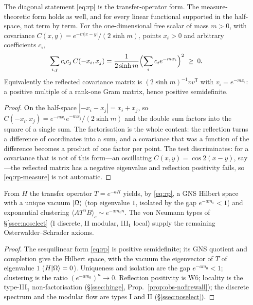 \begin{proposition}\label{prop:rp-measure}
The diagonal statement \eqref{eq:rp} is the transfer-operator form. The measure-theoretic form
holds as well, and for every linear functional supported in the half-space, not term by term.
For the one-dimensional free scalar of mass $m>0$, with covariance
$C(x,y)=e^{-m|x-y|}/(2\sinh m)$, points $x_i>0$ and arbitrary coefficients $c_i$,
\begin{equation}\label{eq:rp-measure}
  \sum_{i,j}c_ic_j\,C(-x_i,x_j)
  =\frac{1}{2\sinh m}\Bigl(\sum_i c_i e^{-m x_i}\Bigr)^{2}\;\ge\;0 .
\end{equation}
Equivalently the reflected covariance matrix is $(2\sinh m)^{-1}vv^{\mathsf T}$ with
$v_i=e^{-m x_i}$: a positive multiple of a rank-one Gram matrix, hence positive semidefinite.

\end{proposition}
\begin{proof}
On the half-space $|-x_i-x_j|=x_i+x_j$, so $C(-x_i,x_j)=e^{-mx_i}e^{-mx_j}/(2\sinh m)$ and the
double sum factors into the square of a single sum. The factorisation is the whole content: the
reflection turns a difference of coordinates into a sum, and a covariance that was a function of
the difference becomes a product of one factor per point. The test discriminates: for a covariance
that is not of this form---an oscillating $C(x,y)=\cos 2(x-y)$, say---the reflected matrix has a
negative eigenvalue and reflection positivity fails, so \eqref{eq:rp-measure} is not automatic.
\end{proof}

\begin{theorem}\label{thm:os}
From $H$ the transfer operator $T=e^{-aH}$ yields, by \eqref{eq:rp}, a GNS Hilbert space with a
unique vacuum $\lvert\Omega\rangle$ (top eigenvalue $1$, isolated by the gap $e^{-a m_0}<1$) and
exponential clustering $\langle A T^{n}B\rangle_c\sim e^{-a m_0 n}$. The von Neumann types of
\S\ref*{ssec:noselect} (I discrete, II modular, III$_1$ local) supply the remaining
Osterwalder--Schrader axioms.


\end{theorem}
\begin{proof}
The sesquilinear form \eqref{eq:rp} is positive semidefinite; its GNS quotient and completion give
the Hilbert space, with the vacuum the eigenvector of $T$ of eigenvalue $1$ ($H\lvert\Omega\rangle=0$).
Uniqueness and isolation are the gap $e^{-a m_0}<1$; clustering is the ratio $(e^{-a m_0})^{n}\to0$.
Reflection positivity is W6; locality is the type-III$_1$ non-factorisation
(\S\ref*{ssec:hinge}, Prop.~\ref*{prop:obs-nofirewall}); the discrete spectrum and the modular flow
are types I and II (\S\ref*{ssec:noselect}).
\end{proof}

